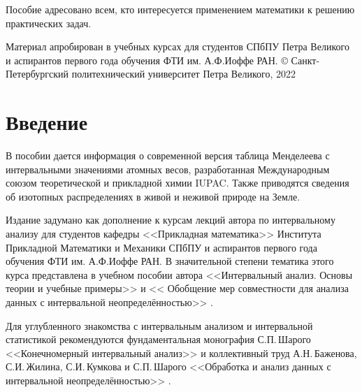 \documentclass[a5paper,openany]{book}
\begin{document}
Пособие адресовано всем, кто интересуется применением математики к решению практических задач.


Материал апробирован в учебных курсах для студентов 
СПбПУ Петра Великого и аспирантов первого года обучения ФТИ им. А.Ф.Иоффе РАН.
\hfill \break
\hfill \break
\hfill \break
\copyright 
Санкт-Петербургский политехнический университет Петра Великого, 2022




\tableofcontents      %



\chapter*{Введение}

\bigskip

В пособии дается информация о современной версия таблица Менделеева с интервальными значениями атомных весов, разработанная Международным союзом теоретической 
и прикладной химии IUPAC. Также приводятся сведения об изотопных распределениях в живой и неживой природе на Земле.

Издание задумано как дополнение к курсам лекций автора по интервальному анализу для студентов кафедры <<Прикладная математика>> Института Прикладной Математики и Механики СПбПУ и аспирантов первого года обучения ФТИ им. А.Ф.Иоффе РАН. В значительной степени тематика этого курса представлена в учебном пособии автора <<Интервальный анализ. Основы теории и учебные примеры>> \cite{Bazhenov2020} и << Обобщение мер совместности для анализа данных с интервальной неопределённостью>> \cite{Bazhenov2022}.

Для углубленного знакомства с интервальным анализом и интервальной статистикой рекомендуются фундаментальная монография С.П.\,Шарого <<Конечномерный интервальный анализ>> \cite{SharyBook} и коллективный труд А.Н.\,Баженова, С.И.\,Жилина, С.И.\,Кумкова и С.П.\,Шарого <<Обработка и анализ данных с интервальной неопределённостью>> \cite{BookIntStat}.
\end{document}
